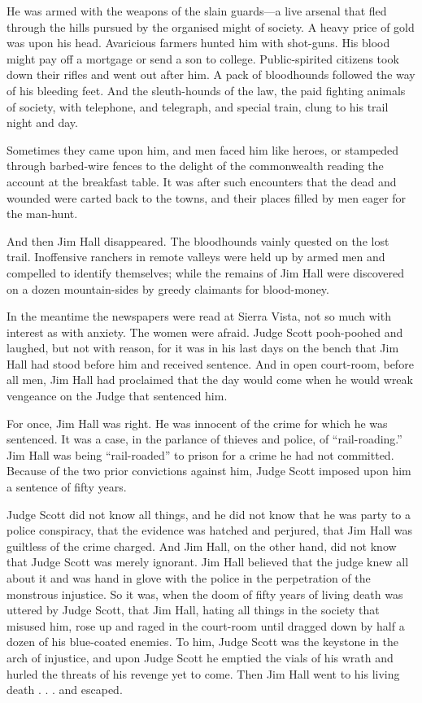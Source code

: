 \documentclass[10pt]{book}
\begin{document}
He was armed with the weapons of the slain guards—a live arsenal that
fled through the hills pursued by the organised might of society. A
heavy price of gold was upon his head. Avaricious farmers hunted him
with shot-guns. His blood might pay off a mortgage or send a son to
college. Public-spirited citizens took down their rifles and went out
after him. A pack of bloodhounds followed the way of his bleeding feet.
And the sleuth-hounds of the law, the paid fighting animals of society,
with telephone, and telegraph, and special train, clung to his trail
night and day.

Sometimes they came upon him, and men faced him like heroes, or
stampeded through barbed-wire fences to the delight of the commonwealth
reading the account at the breakfast table. It was after such
encounters that the dead and wounded were carted back to the towns, and
their places filled by men eager for the man-hunt.

And then Jim Hall disappeared. The bloodhounds vainly quested on the
lost trail. Inoffensive ranchers in remote valleys were held up by
armed men and compelled to identify themselves; while the remains of
Jim Hall were discovered on a dozen mountain-sides by greedy claimants
for blood-money.

In the meantime the newspapers were read at Sierra Vista, not so much
with interest as with anxiety. The women were afraid. Judge Scott
pooh-poohed and laughed, but not with reason, for it was in his last
days on the bench that Jim Hall had stood before him and received
sentence. And in open court-room, before all men, Jim Hall had
proclaimed that the day would come when he would wreak vengeance on the
Judge that sentenced him.

For once, Jim Hall was right. He was innocent of the crime for which he
was sentenced. It was a case, in the parlance of thieves and police, of
“rail-roading.” Jim Hall was being “rail-roaded” to prison for a crime
he had not committed. Because of the two prior convictions against him,
Judge Scott imposed upon him a sentence of fifty years.

Judge Scott did not know all things, and he did not know that he was
party to a police conspiracy, that the evidence was hatched and
perjured, that Jim Hall was guiltless of the crime charged. And Jim
Hall, on the other hand, did not know that Judge Scott was merely
ignorant. Jim Hall believed that the judge knew all about it and was
hand in glove with the police in the perpetration of the monstrous
injustice. So it was, when the doom of fifty years of living death was
uttered by Judge Scott, that Jim Hall, hating all things in the society
that misused him, rose up and raged in the court-room until dragged
down by half a dozen of his blue-coated enemies. To him, Judge Scott
was the keystone in the arch of injustice, and upon Judge Scott he
emptied the vials of his wrath and hurled the threats of his revenge
yet to come. Then Jim Hall went to his living death . . . and escaped.
\end{document}
